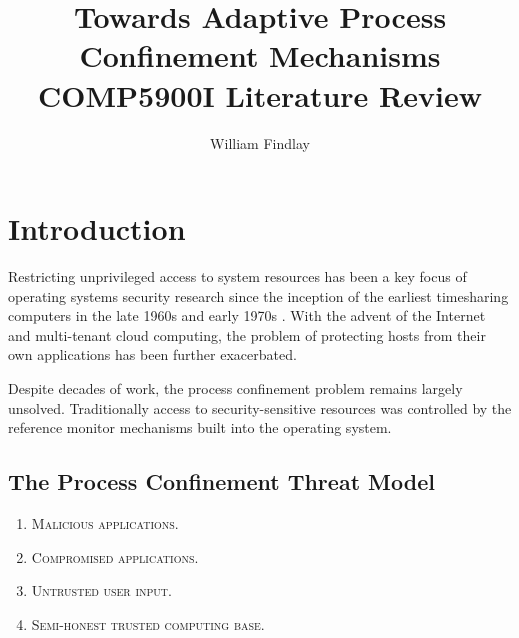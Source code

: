 \documentclass[dvipsnames, 12pt]{article}
\title{\huge Towards Adaptive Process Confinement
Mechanisms\\{\large COMP5900I Literature Review}}
\author{William Findlay}
\begin{document}
\maketitle
\thispagestyle{plain}


\setcounter{page}{1}

\begin{abstract}
\end{abstract}

\onehalfspacing

\section{Introduction}

Restricting unprivileged access to system resources has been a key focus of
operating systems security research since the inception of the earliest
timesharing computers in the late 1960s and early 1970s
\cite{lampson_1973_a_note, graham_1968_protection}. With the advent of the
Internet and multi-tenant cloud computing, the problem of protecting hosts from
their own applications has been further exacerbated.

Despite decades of work, the process confinement problem remains largely
unsolved. Traditionally access to security-sensitive resources was controlled by
the reference monitor mechanisms built into the operating system.

\subsection{The Process Confinement Threat Model}

\begin{enumerate}[label=\bfseries T\arabic*.]
    \item \textsc{Malicious applications.}
    \item \textsc{Compromised applications.}
    \item \textsc{Untrusted user input.}
    \item \textsc{Semi-honest trusted computing base.}
\end{enumerate}
\end{document}
